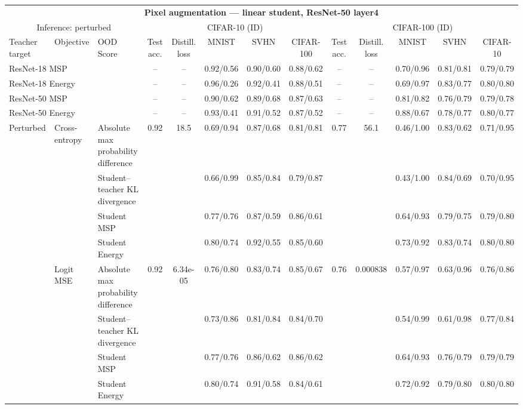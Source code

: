 \documentclass[border=2pt]{standalone}
\begin{document}
\scriptsize
\setlength{\tabcolsep}{3pt}
\begin{tabular}{lllcccccccccc}
\multicolumn{13}{c}{\textbf{Pixel augmentation --- linear student, ResNet-50 layer4}}\\[4pt]
\multicolumn{3}{c}{Inference: perturbed} & \multicolumn{5}{c}{CIFAR-10 (ID)} & \multicolumn{5}{c}{CIFAR-100 (ID)} \\
\cmidrule(lr){4-8} \cmidrule(lr){9-13}
\toprule
Teacher target & Objective & OOD Score & Test acc. & Distill. loss & MNIST & SVHN & CIFAR-100 & Test acc. & Distill. loss & MNIST & SVHN & CIFAR-10 \\
\midrule
\multicolumn{3}{l}{ResNet-18 MSP} & -- & -- & 0.92/0.56 & 0.90/0.60 & 0.88/0.62 & -- & -- & 0.70/0.96 & 0.81/0.81 & 0.79/0.79 \\
\multicolumn{3}{l}{ResNet-18 Energy} & -- & -- & 0.96/0.26 & 0.92/0.41 & 0.88/0.51 & -- & -- & 0.69/0.97 & 0.83/0.77 & 0.80/0.80 \\
\multicolumn{3}{l}{ResNet-50 MSP} & -- & -- & 0.90/0.62 & 0.89/0.68 & 0.87/0.63 & -- & -- & 0.81/0.82 & 0.76/0.79 & 0.79/0.78 \\
\multicolumn{3}{l}{ResNet-50 Energy} & -- & -- & 0.93/0.41 & 0.91/0.52 & 0.87/0.52 & -- & -- & 0.88/0.67 & 0.78/0.77 & 0.80/0.77 \\
\midrule
Perturbed & Cross-entropy & Absolute max probability difference & 0.92 & 18.5 & 0.69/0.94 & 0.87/0.68 & 0.81/0.81 & 0.77 & 56.1 & 0.46/1.00 & 0.83/0.62 & 0.71/0.95 \\
 &  & Student--teacher KL divergence &  &  & 0.66/0.99 & 0.85/0.84 & 0.79/0.87 &  &  & 0.43/1.00 & 0.84/0.69 & 0.70/0.95 \\
 &  & Student MSP &  &  & 0.77/0.76 & 0.87/0.59 & 0.86/0.61 &  &  & 0.64/0.93 & 0.79/0.75 & 0.79/0.80 \\
 &  & Student Energy &  &  & 0.80/0.74 & 0.92/0.55 & 0.85/0.60 &  &  & 0.73/0.92 & 0.83/0.74 & 0.80/0.80 \\
\addlinespace
 & Logit MSE & Absolute max probability difference & 0.92 & 6.34e-05 & 0.76/0.80 & 0.83/0.74 & 0.85/0.67 & 0.76 & 0.000838 & 0.57/0.97 & 0.63/0.96 & 0.76/0.86 \\
 &  & Student--teacher KL divergence &  &  & 0.73/0.86 & 0.81/0.84 & 0.84/0.70 &  &  & 0.54/0.99 & 0.61/0.98 & 0.77/0.84 \\
 &  & Student MSP &  &  & 0.77/0.76 & 0.86/0.62 & 0.86/0.62 &  &  & 0.64/0.93 & 0.76/0.79 & 0.79/0.79 \\
 &  & Student Energy &  &  & 0.80/0.74 & 0.91/0.58 & 0.84/0.61 &  &  & 0.72/0.92 & 0.79/0.80 & 0.80/0.80 \\

\end{tabular}
\end{document}
